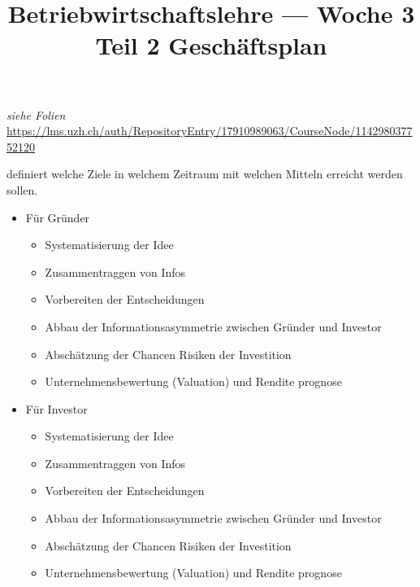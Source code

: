 \documentclass[a4paper]{article}
\title{\textbf{Betriebwirtschaftslehre — Woche 3 Teil 2 Geschäftsplan}}
\begin{document}
\maketitle
\textit{siehe Folien} \url{https://lms.uzh.ch/auth/RepositoryEntry/17910989063/CourseNode/114298037752120}
    \begin{definition}
        [Geschäftsplan] definiert welche Ziele in welchem Zeitraum mit welchen Mitteln erreicht werden sollen.
    \end{definition}
    \begin{itemize}
        \item Für Gründer 
        \begin{itemize}
                    \item Systematisierung der Idee

        \item Zusammentraggen von Infos

        \item Vorbereiten der Entscheidungen

        \item Abbau der Informationsasymmetrie zwischen Gründer und Investor 

        \item Abschätzung der Chancen Risiken der Investition

        \item Unternehmensbewertung (Valuation) und Rendite prognose

        \end{itemize}
        \item Für Investor
        \begin{itemize}
                    \item Systematisierung der Idee

        \item Zusammentraggen von Infos

        \item Vorbereiten der Entscheidungen

        \item Abbau der Informationsasymmetrie zwischen Gründer und Investor 

        \item Abschätzung der Chancen Risiken der Investition

        \item Unternehmensbewertung (Valuation) und Rendite prognose

        \end{itemize}
    \end{itemize}
\pagebreak
\end{document}
